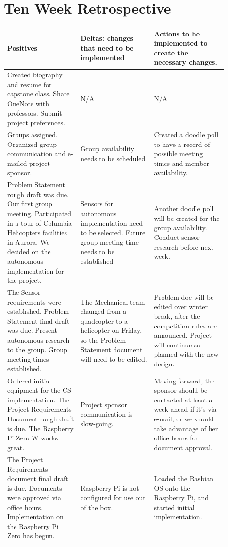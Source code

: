 \documentclass[onecolumn, draftclsnofoot,10pt, compsoc]{IEEEtran}
\begin{document}
\section{Ten Week Retrospective}
\vspace{.25in}
\begin{center}
    \begin{tabular}{|p{0.3\linewidth}|p{0.3\linewidth}|p{0.3\linewidth}|}
        \hline
		 Positives & Deltas: changes that need to be implemented & Actions  to be implemented to create the necessary changes. \\
        \hline
		 Created biography and resume for capstone class. Share OneNote with professors. Submit project preferences. & N/A & N/A  \\
		\hline
         Groups assigned. Organized group communication and e-mailed project sponsor. & Group availability needs to be scheduled & Created a doodle poll to have a record of possible meeting times and member availability.  \\
		\hline
         Problem Statement rough draft was due. Our first group meeting. Participated in a tour of Columbia Helicopters facilities in Aurora. We decided on the autonomous implementation for the project. & Sensors for autonomous implementation need to be selected. Future group meeting time needs to be established. & Another doodle poll will  be created for the group availability. Conduct sensor research before next week.  \\
		\hline
         The Sensor requirements were established. Problem Statement final draft was due. Present autonomous research to the group. Group meeting times established. & The Mechanical team changed from a quadcopter to a helicopter on Friday, so the Problem Statement document will need to be edited. & Problem doc will be edited over winter break, after the competition rules are announced. Project will continue as planned with the new design. \\
		\hline
         Ordered initial equipment for the CS implementation. The Project Requirements Document rough draft is due. The Raspberry Pi Zero W works great. & Project sponsor communication is slow-going. & Moving forward, the sponsor should be contacted at least a week ahead if it's via e-mail, or we should take advantage of her office hours for document approval. \\
		\hline
         The Project Requirements document final draft is due. Documents were approved via office hours. Implementation on the Raspberry Pi Zero has begun. & Raspberry Pi is not configured for use out of the box. &  Loaded the Rasbian OS onto the Raspberry Pi, and started initial implementation. \\

\end{tabular}
\end{center}
\end{document}
